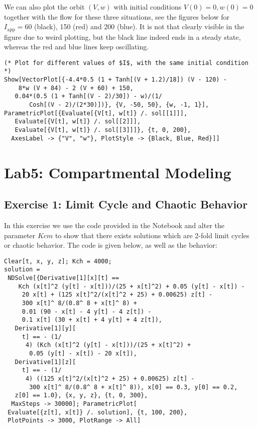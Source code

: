 \documentclass[11pt,a4paper,onecolumn]{article}
\begin{document}
\begin{figure}[H]
  \centering
\end{figure}

We can also plot the orbit $(V,w)$ with initial conditions $V(0) = 0, w(0) = 0$ together with the flow for these three situations, see the figures below for $I_{\text{app}} = 60$ (black), 150 (red) and 200 (blue). It is not that clearly visible in the figure due to weird plotting, but the black line indeed ends in a steady state, whereas the red and blue lines keep oscillating. 

\begin{lstlisting}
(* Plot for different values of $I$, with the same initial condition *)
Show[VectorPlot[{-4.4*0.5 (1 + Tanh[(V + 1.2)/18]) (V - 120) - 
    8*w (V + 84) - 2 (V + 60) + 150, 
   0.04*(0.5 (1 + Tanh[(V - 2)/30]) - w)/(1/
       Cosh[(V - 2)/(2*30)])}, {V, -50, 50}, {w, -1, 1}],
ParametricPlot[{Evaluate[{V[t], w[t]} /. sol[[1]]], 
   Evaluate[{V[t], w[t]} /. sol[[2]]], 
   Evaluate[{V[t], w[t]} /. sol[[3]]]}, {t, 0, 200}, 
  AxesLabel -> {"V", "w"}, PlotStyle -> {Black, Blue, Red}]]  
\end{lstlisting}

\begin{figure}[H]
  \centering
\end{figure}

\newpage

\section{Lab5: Compartmental Modeling}
\subsection{Exercise 1: Limit Cycle and Chaotic Behavior}
In this exercise we use the code provided in the Notebook and alter the parameter $Kcm$ to show that there exists solutions which are 2-fold limit cycles or chaotic behavior. The code is given below, as well as the behavior:

\begin{lstlisting}[mathescape]
Clear[t, x, y, z]; Kch = 4000;
solution = 
 NDSolve[{Derivative[1][x][t] == 
    Kch (x[t]^2 (y[t] - x[t]))/(25 + x[t]^2) + 0.05 (y[t] - x[t]) - 
     20 x[t] + (125 x[t]^2/(x[t]^2 + 25) + 0.00625) z[t] - 
     300 x[t]^ 8/(0.8^ 8 + x[t]^ 8) + 
     0.01 (90 - x[t] - 4 y[t] - 4 z[t]) - 
     0.1 x[t] (30 + x[t] + 4 y[t] + 4 z[t]), 
   Derivative[1][y][
     t] == - (1/
      4) (Kch (x[t]^2 (y[t] - x[t]))/(25 + x[t]^2) + 
       0.05 (y[t] - x[t]) - 20 x[t]), 
   Derivative[1][z][
     t] == - (1/
      4) ((125 x[t]^2/(x[t]^2 + 25) + 0.00625) z[t] - 
       300 x[t]^ 8/(0.8^ 8 + x[t]^ 8)), x[0] == 0.3, y[0] == 0.2, 
   z[0] == 1.0}, {x, y, z}, {t, 0, 300}, 
  MaxSteps -> 30000]; ParametricPlot[
 Evaluate[{z[t], x[t]} /. solution], {t, 100, 200}, 
 PlotPoints -> 3000, PlotRange -> All]
\end{lstlisting}
\end{document}
